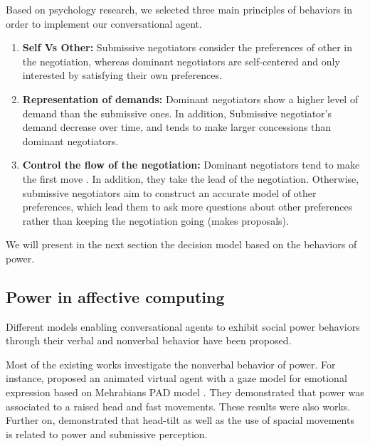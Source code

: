 \documentclass{llncs}
\begin{document}
	
	Based on psychology research, we selected three main principles of behaviors in order to implement our conversational agent.
	\begin{enumerate}
	\item \textbf{Self Vs Other:} Submissive negotiators consider the preferences of other in the negotiation, whereas dominant negotiators  are self-centered and only interested by satisfying their own preferences.
	
	\item \textbf{Representation of demands:} Dominant negotiators show a higher level of demand than the submissive ones. In addition,  Submissive negotiator's demand decrease over time, and tends to make larger concessions than dominant negotiators.
	
	\item \textbf{Control the flow of the negotiation:}
	Dominant negotiators tend to make the first move \cite{magee2007power}. In addition, they take the lead of the negotiation. Otherwise, submissive negotiators aim to construct an accurate model of other preferences, which lead them to ask more questions about other preferences rather than keeping the negotiation going (makes proposals).
	
	\end{enumerate}
		We will present in the next section the decision model based on the behaviors of power. 
	
	\subsection{Power in affective computing}
	Different models enabling conversational agents to exhibit social power behaviors through their verbal and nonverbal behavior have been proposed. 
	
	Most of the existing works investigate the nonverbal behavior of power. For instance, \cite{lance2008relation} proposed an animated virtual agent with a gaze model for emotional expression based on Mehrabians PAD model \cite{mehrabian1996analysis}. They demonstrated that power was associated to a raised head and fast movements. These results were also \cite{mignault2003many} works.
	 Further on, \cite{gebhard2014exploring,callejas2014computational} demonstrated that head-tilt as well as the use of spacial movements is related to power and submissive perception. 
	  
\end{document}
